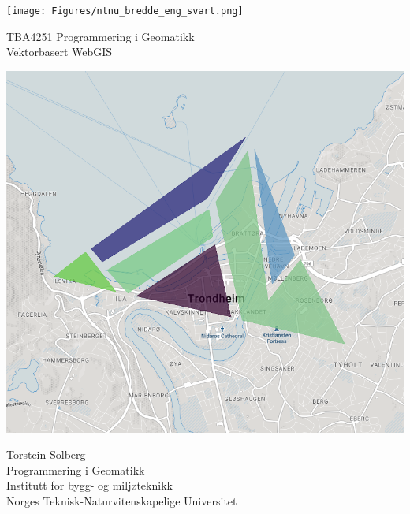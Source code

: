 \thispagestyle{empty}
\texttt{[image: Figures/ntnu\_bredde\_eng\_svart.png]}
\begin{center}
\vspace{2pc}
\Huge{TBA4251 Programmering i Geomatikk \\ Vektorbasert WebGIS}
\vspace{4pc}

    \includegraphics[scale=0.5]{Figures/forside.png}

\vspace{4pc}
\end{center}

Torstein Solberg\\
Programmering i Geomatikk\\
Institutt for bygg- og miljøteknikk\\
Norges Teknisk-Naturvitenskapelige Universitet







